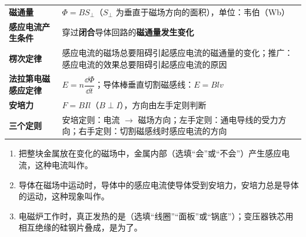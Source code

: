 \begin{zhishi}
\small
\begin{tabularx}{\linewidth}{>{\sffamily\bfseries}m{3.3cm} Y}
磁通量 & $\Phi=BS_{\perp}$（$S_{\perp}$ 为垂直于磁场方向的面积），单位：韦伯（Wb） \\
感应电流产生条件 & 穿过\textbf{闭合}导体回路的\textbf{磁通量发生变化} \\
楞次定律 & 感应电流的磁场总要阻碍引起感应电流的磁通量的变化；推广：感应电流的效果总要阻碍引起感应电流的原因 \\
法拉第电磁感应定律 & $E=n\dfrac{\dd\Phi}{\dd t}$；导体棒垂直切割磁感线：$E=Blv$ \\
安培力 & $F=BIl$（$B\perp I$），方向由左手定则判断 \\
三个定则 & 安培定则：电流 $\to$ 磁场方向；左手定则：通电导线的受力方向；右手定则：切割磁感线时感应电流的方向 \\
\end{tabularx}
\end{zhishi}

\noindent{}
\begin{enumerate}[label=\arabic*．,leftmargin=2em,itemsep=3pt]
  \item 把整块金属放在变化的磁场中，金属内部（选填“会”或“不会”）产生感应电流，这种电流叫作。
  \item 导体在磁场中运动时，导体中的感应电流使导体受到安培力，安培力总是导体的运动，这种现象叫作。
  \item 电磁炉工作时，真正发热的是（选填“线圈”“面板”或“锅底”）；变压器铁芯用相互绝缘的硅钢片叠成，是为了。
\end{enumerate}

\clearpage
